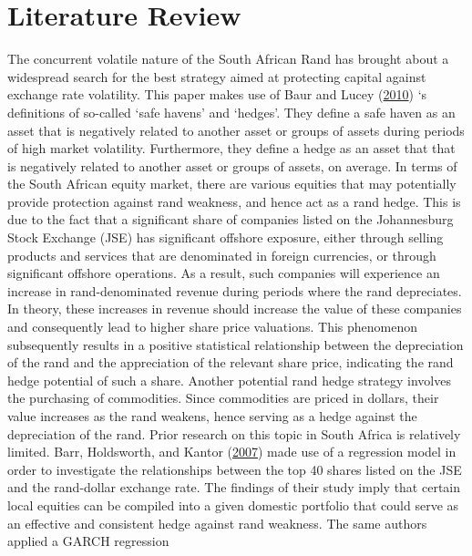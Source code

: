 \documentclass[11pt,preprint, authoryear]{elsarticle}
\numberwithin{equation}{section}
\numberwithin{figure}{section}
\numberwithin{table}{section}
\begin{document}
\pagebreak

\section{\texorpdfstring{Literature Review
\label{Lit_Review}}{Literature Review }}\label{literature-review}

The concurrent volatile nature of the South African Rand has brought
about a widespread search for the best strategy aimed at protecting
capital against exchange rate volatility. This paper makes use of Baur
and Lucey (\protect\hyperlink{ref-baur2010}{2010}) `s definitions of
so-called `safe havens' and `hedges'. They define a safe haven as an
asset that is negatively related to another asset or groups of assets
during periods of high market volatility. Furthermore, they define a
hedge as an asset that that is negatively related to another asset or
groups of assets, on average. In terms of the South African equity
market, there are various equities that may potentially provide
protection against rand weakness, and hence act as a rand hedge. This is
due to the fact that a significant share of companies listed on the
Johannesburg Stock Exchange (JSE) has significant offshore exposure,
either through selling products and services that are denominated in
foreign currencies, or through significant offshore operations. As a
result, such companies will experience an increase in rand-denominated
revenue during periods where the rand depreciates. In theory, these
increases in revenue should increase the value of these companies and
consequently lead to higher share price valuations. This phenomenon
subsequently results in a positive statistical relationship between the
depreciation of the rand and the appreciation of the relevant share
price, indicating the rand hedge potential of such a share. Another
potential rand hedge strategy involves the purchasing of commodities.
Since commodities are priced in dollars, their value increases as the
rand weakens, hence serving as a hedge against the depreciation of the
rand. Prior research on this topic in South Africa is relatively
limited. Barr, Holdsworth, and Kantor
(\protect\hyperlink{ref-barr2007}{2007}) made use of a regression model
in order to investigate the relationships between the top 40 shares
listed on the JSE and the rand-dollar exchange rate. The findings of
their study imply that certain local equities can be compiled into a
given domestic portfolio that could serve as an effective and consistent
hedge against rand weakness. The same authors applied a GARCH regression
\end{document}
